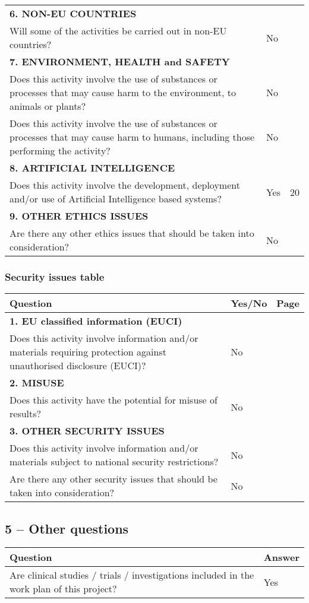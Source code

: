 \documentclass[11pt, a4paper]{article}
\begin{document}
\begin{tabular}{p{} p{} p{}}
\midrule
\textbf{6. NON-EU COUNTRIES} & & \\
Will some of the activities be carried out in non-EU countries? & No & \\
\midrule
\textbf{7. ENVIRONMENT, HEALTH and SAFETY} & & \\
Does this activity involve the use of substances or processes that may cause harm to the environment, to animals or plants? & No & \\
Does this activity involve the use of substances or processes that may cause harm to humans, including those performing the activity? & No & \\
\midrule
\textbf{8. ARTIFICIAL INTELLIGENCE} & & \\
Does this activity involve the development, deployment and/or use of Artificial Intelligence based systems? & Yes & 20 \\
\midrule
\textbf{9. OTHER ETHICS ISSUES} & & \\
Are there any other ethics issues that should be taken into consideration? & No & \\
\bottomrule
\end{tabular}

\subsubsection*{Security issues table}
\begin{tabular}{p{} p{} p{}}
\toprule
\textbf{Question} & \textbf{Yes/No} & \textbf{Page} \\
\midrule
\textbf{1. EU classified information (EUCI)} & & \\
Does this activity involve information and/or materials requiring protection against unauthorised disclosure (EUCI)? & No & \\
\midrule
\textbf{2. MISUSE} & & \\
Does this activity have the potential for misuse of results? & No & \\
\midrule
\textbf{3. OTHER SECURITY ISSUES} & & \\
Does this activity involve information and/or materials subject to national security restrictions? & No & \\
Are there any other security issues that should be taken into consideration? & No & \\
\bottomrule
\end{tabular}

\subsection*{5 – Other questions}
\begin{tabular}{p{} p{}}
\toprule
\textbf{Question} & \textbf{Answer} \\
\midrule
Are clinical studies / trials / investigations included in the work plan of this project? & Yes \\
\bottomrule
\end{tabular}
\end{document}
